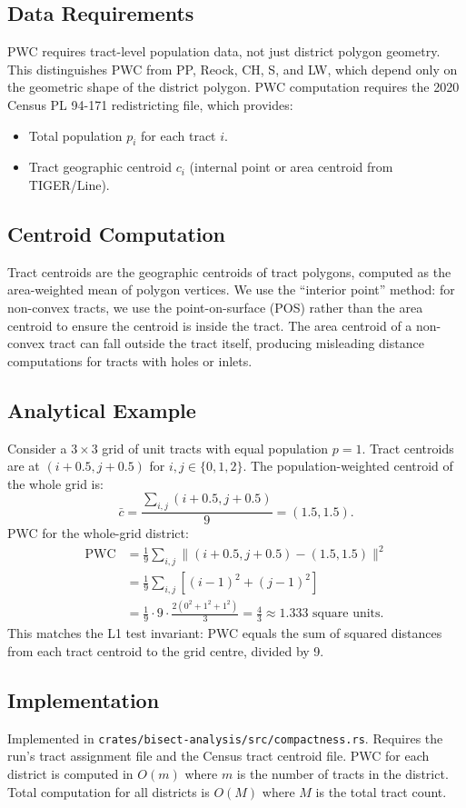 \subsection{Data Requirements}

PWC requires tract-level population data, not just district polygon geometry.
This distinguishes PWC from PP, Reock, CH, S, and LW, which depend only on
the geometric shape of the district polygon.
PWC computation requires the 2020 Census PL 94-171 redistricting file,
which provides:
\begin{itemize}
  \item Total population $p_i$ for each tract $i$.
  \item Tract geographic centroid $c_i$ (internal point or area centroid from TIGER/Line).
\end{itemize}

\subsection{Centroid Computation}

Tract centroids are the geographic centroids of tract polygons,
computed as the area-weighted mean of polygon vertices.
We use the ``interior point'' method: for non-convex tracts, we use the
point-on-surface (POS) rather than the area centroid to ensure the centroid
is inside the tract.
The area centroid of a non-convex tract can fall outside the tract itself,
producing misleading distance computations for tracts with holes or inlets.

\subsection{Analytical Example}

Consider a $3 \times 3$ grid of unit tracts with equal population $p = 1$.
Tract centroids are at $(i + 0.5, j + 0.5)$ for $i, j \in \{0, 1, 2\}$.
The population-weighted centroid of the whole grid is:
\[
  \bar{c} = \frac{\sum_{i,j} (i + 0.5, j + 0.5)}{9} = (1.5, 1.5).
\]
PWC for the whole-grid district:
\begin{align}
  \text{PWC} &= \frac{1}{9} \sum_{i,j} \|(i+0.5, j+0.5) - (1.5, 1.5)\|^2 \\
  &= \frac{1}{9} \sum_{i,j} \left[(i-1)^2 + (j-1)^2\right] \\
  &= \frac{1}{9} \cdot 9 \cdot \frac{2(0^2 + 1^2 + 1^2)}{3}
  = \frac{4}{3} \approx 1.333 \text{ square units}.
\end{align}
This matches the L1 test invariant: PWC equals the sum of squared distances
from each tract centroid to the grid centre, divided by 9.

\subsection{Implementation}

Implemented in \texttt{crates/bisect-analysis/src/compactness.rs}.
Requires the run's tract assignment file and the Census tract centroid file.
PWC for each district is computed in $O(m)$ where $m$ is the number of tracts
in the district.
Total computation for all districts is $O(M)$ where $M$ is the total tract count.

